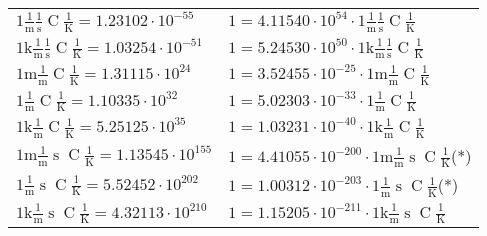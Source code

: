 \begin{center}
\begin{longtable}{l l}
{\color{black}$1 \bm{\mathrm{ }}\frac1{\operatorname{m}}\frac1{\operatorname{s}}{\operatorname{C}}\frac1{\operatorname{K}} = 1.23102\cdot10^{-55} $}   & {\color{black}$ 1 = 4.11540\cdot10^{54} \cdot 1 \bm{\mathrm{ }}\frac1{\operatorname{m}}\frac1{\operatorname{s}}{\operatorname{C}}\frac1{\operatorname{K}}$}  \\
{\color{gray}$1 \bm{\mathrm{ k}}\frac1{\operatorname{m}}\frac1{\operatorname{s}}{\operatorname{C}}\frac1{\operatorname{K}} = 1.03254\cdot10^{-51} $}   & {\color{gray}$ 1 = 5.24530\cdot10^{50} \cdot 1 \bm{\mathrm{ k}}\frac1{\operatorname{m}}\frac1{\operatorname{s}}{\operatorname{C}}\frac1{\operatorname{K}}$}  \\
{\color{gray}$1 \bm{\mathrm{ m}}\frac1{\operatorname{m}}{}{\operatorname{C}}\frac1{\operatorname{K}} = 1.31115\cdot10^{24} $}   & {\color{gray}$ 1 = 3.52455\cdot10^{-25} \cdot 1 \bm{\mathrm{ m}}\frac1{\operatorname{m}}{}{\operatorname{C}}\frac1{\operatorname{K}}$}  \\
{\color{black}$1 \bm{\mathrm{ }}\frac1{\operatorname{m}}{}{\operatorname{C}}\frac1{\operatorname{K}} = 1.10335\cdot10^{32} $}   & {\color{black}$ 1 = 5.02303\cdot10^{-33} \cdot 1 \bm{\mathrm{ }}\frac1{\operatorname{m}}{}{\operatorname{C}}\frac1{\operatorname{K}}$}  \\
{\color{gray}$1 \bm{\mathrm{ k}}\frac1{\operatorname{m}}{}{\operatorname{C}}\frac1{\operatorname{K}} = 5.25125\cdot10^{35} $}   & {\color{gray}$ 1 = 1.03231\cdot10^{-40} \cdot 1 \bm{\mathrm{ k}}\frac1{\operatorname{m}}{}{\operatorname{C}}\frac1{\operatorname{K}}$}  \\
{\color{gray}$1 \bm{\mathrm{ m}}\frac1{\operatorname{m}}{\operatorname{s}}{\operatorname{C}}\frac1{\operatorname{K}} = 1.13545\cdot10^{155} $}   & {\color{gray}$ 1 = 4.41055\cdot10^{-200} \cdot 1 \bm{\mathrm{ m}}\frac1{\operatorname{m}}{\operatorname{s}}{\operatorname{C}}\frac1{\operatorname{K}}$}\quad(*)\\
{\color{black}$1 \bm{\mathrm{ }}\frac1{\operatorname{m}}{\operatorname{s}}{\operatorname{C}}\frac1{\operatorname{K}} = 5.52452\cdot10^{202} $}   & {\color{black}$ 1 = 1.00312\cdot10^{-203} \cdot 1 \bm{\mathrm{ }}\frac1{\operatorname{m}}{\operatorname{s}}{\operatorname{C}}\frac1{\operatorname{K}}$}\quad(*)\\
{\color{gray}$1 \bm{\mathrm{ k}}\frac1{\operatorname{m}}{\operatorname{s}}{\operatorname{C}}\frac1{\operatorname{K}} = 4.32113\cdot10^{210} $}   & {\color{gray}$ 1 = 1.15205\cdot10^{-211} \cdot 1 \bm{\mathrm{ k}}\frac1{\operatorname{m}}{\operatorname{s}}{\operatorname{C}}\frac1{\operatorname{K}}$}  \\

\end{longtable}
\end{center}
